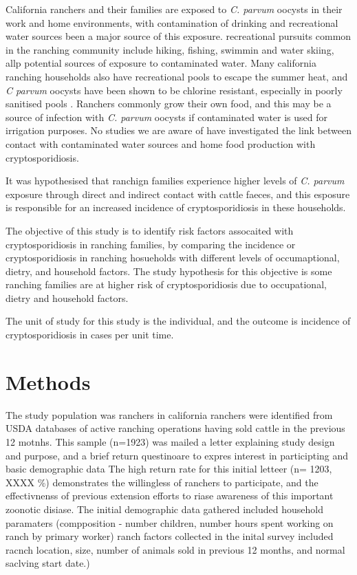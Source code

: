\documentclass[12pt]{article}
\begin{document}
	California ranchers and their families are exposed to \emph{C. parvum} oocysts in their work and home environments, with contamination of drinking and recreational water sources been a major source of this exposure.
	recreational pursuits common in the ranching community include hiking, fishing, swimmin and water skiing, allp potential sources of exposure to contaminated water. 
	Many california ranching households also have recreational pools to escape the summer heat, and \emph{C parvum} oocysts have been shown to be chlorine resistant, especially in poorly sanitised pools \cite{Carpenter1999}.
	Ranchers commonly grow their own food, and this may be a source of infection with \emph{C. parvum} oocysts if contaminated water is used for irrigation purposes.
	No studies we are aware of have investigated the link between contact with contaminated water sources and home food production with cryptosporidiosis. 


	It was hypothesised that ranchign families experience higher levels of \emph{C. parvum} exposure through direct and indirect contact with cattle faeces, and this esposure is responsible for an increased incidence of cryptosporidiosis in these households.

		
	The objective of this study is to identify risk factors assocaited with cryptosporidiosis in ranching families, by comparing the incidence or cryptosporidiosis in ranching hosueholds with different levels of occumaptional, dietry, and household factors.
	The study hypothesis for this objective is some ranching families are at higher risk of cryptosporidiosis due to occupational, dietry and household factors.

	The unit of study for this study is the individual, and the outcome is incidence of cryptosporidiosis in cases per unit time.

	\section{Methods} 
		The study population was ranchers in california 
		ranchers were identified from USDA databases of active ranching operations having sold cattle in the previous 12 motnhs. 
		This sample (n=1923) was mailed a letter explaining study design and purpose, and a brief return questinoare to expres interest in participting and basic demographic data 
		The high return rate for this initial letteer (n= 1203, XXXX \%) demonstrates the willingless of ranchers to participate, and the effectivnenss of previous extension efforts to riase awareness of this important zoonotic disiase. 
		The initial demographic data gathered included household paramaters (compposition - number children, number hours spent working on ranch by primary worker)
		ranch factors collected in the inital survey included racnch location, size, number of animals sold in previous 12 months, and normal saclving start date.)
\end{document}
